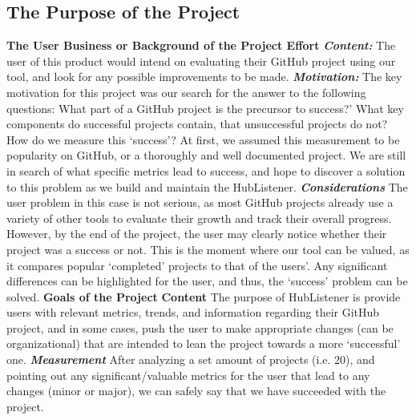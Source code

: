 \documentclass{article}
\begin{document}
\subsection{The Purpose of the Project}
\textbf{The User Business or Background of the Project Effort}
\newline
\textbf{\textit{Content:}} The user of this product would intend on evaluating their GitHub project using our tool, and look for any possible improvements to be made. \newline
\textbf{\textit{Motivation:}}\newline
The key motivation for this project was our search for the answer to the following questions: What part of a GitHub project is the precursor to success?' What key components do successful projects contain, that unsuccessful projects do not? How do we measure this ‘success’? At first, we assumed this measurement to be popularity on GitHub, or a thoroughly and well documented project. We are still in search of what specific metrics lead to success, and hope to discover a solution to this problem as we build and maintain the HubListener. \newline
\textbf{\textit{Considerations}}
The user problem in this case is not serious, as most GitHub projects already use a variety of other tools to evaluate their growth and track their overall progress. However, by the end of the project, the user may clearly notice whether their project was a success or not. This is the moment where our tool can be valued, as it compares popular ‘completed’ projects to that of the users’. Any significant differences can be highlighted for the user, and thus, the ‘success’ problem can be solved. \newline
\newline
\textbf{Goals of the Project}
\textbf{Content}\newline
The purpose of HubListener is provide users with relevant metrics, trends, and information regarding their GitHub project, and in some cases, push the user to make appropriate changes (can be organizational) that are intended to lean the project towards a more ‘successful’ one.\newline
\textbf{\textit{Measurement}}
After analyzing a set amount of projects (i.e. 20), and pointing out any significant/valuable metrics for the user that lead to any changes (minor or major), we can safely say that we have succeeded with the project.
\end{document}
